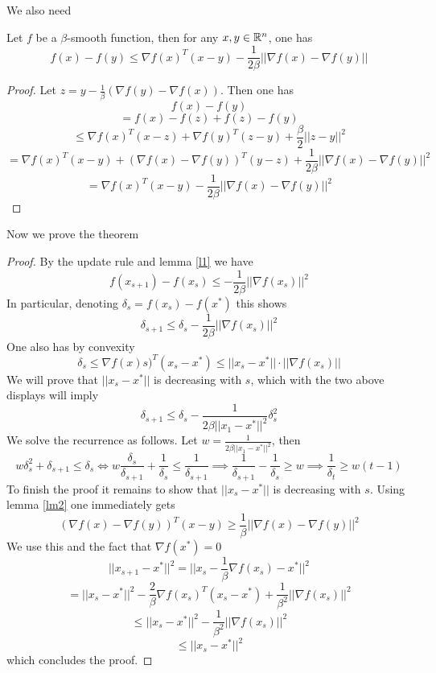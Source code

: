 We also need

\begin{lemma} \label{lm2}
Let $f$ be a $\beta$-smooth function, then for any $x,y \in \mathbb{R}^n$, one has
$$f(x) - f(y)\leq \nabla f(x)^T(x-y) - \frac{1}{2\beta}||\nabla f(x) - \nabla f(y)||$$
\end{lemma}

\begin{proof}
Let $z = y - \frac{1}{\beta}(\nabla f(y) - \nabla f(x))$.  Then one has
$$f(x) - f(y)$$
$$= f(x) - f(z) + f(z) - f(y)$$
$$\leq \nabla f(x)^T(x-z) + \nabla f(y)^T(z-y) + \frac{\beta}{2}||z-y||^2$$
$$= \nabla f(x)^T(x-y) + (\nabla f(x) - \nabla f(y))^T(y-z) + \frac{1}{2\beta}||\nabla f(x) - \nabla f(y)||^2$$
$$= \nabla f(x)^T(x-y) - \frac{1}{2\beta} ||\nabla f(x) - \nabla f(y)||^2$$
\end{proof}

Now we prove the theorem

\begin{proof}
By the update rule and lemma \ref{l1} we have
$$f(x_{s+1}) - f(x_s) \leq -\frac{1}{2\beta}||\nabla f(x_s)||^2 $$
In particular, denoting $\delta_s = f(x_s) - f(x^*)$ this shows
$$\delta_{s+1} \leq \delta_s - \frac{1}{2\beta}||\nabla f(x_s)||^2 $$
One also has by convexity
$$\delta_s \leq \nabla f(x)s)^T(x_s - x^*) \leq ||x_s - x^*|| \cdot ||\nabla f(x_s)||$$
We will prove that $||x_s - x^*||$ is decreasing with $s$, which with the two above displays will imply
$$\delta_{s+1}\leq \delta_s - \frac{1}{2\beta||x_1 - x^*||^2}\delta_s^2$$
We solve the recurrence as follows.  Let $w = \frac{1}{2\beta||x_1 - x^*||^2}$, then
$$w\delta_s^2 + \delta_{s+1} \leq \delta_s \iff w\frac{\delta_s}{\delta_{s+1}} + \frac
{1}{\delta_s} \leq \frac{1}{\delta_{s+1}} \implies \frac{1}{\delta_{s+1}} - \frac{1}{\delta_s} \geq w \implies \frac{1}{\delta_t} \geq w(t-1)$$
To finish the proof it remains to show that $||x_s - x^*||$ is decreasing with $s$.  Using lemma \ref{lm2} one immediately gets
$$ (\nabla f(x) - \nabla f(y))^T(x - y) \geq \frac{1}{\beta} ||\nabla f(x) - \nabla f(y)||^2$$
We use this and the fact that $\nabla f(x^*) = 0$
$$||x_{s+1} - x^*||^2 = ||x_s - \frac{1}{\beta}\nabla f(x_s) - x^*||^2$$
$$= ||x_s - x^*||^2 - \frac{2}{\beta}\nabla f(x_s)^T(x_s - x^*) + \frac{1}{\beta^2}||\nabla f(x_s)||^2 $$
$$\leq ||x_s - x^*||^2 - \frac{1}{\beta^2} ||\nabla f(x_s)||^2 $$
$$\leq ||x_s - x^*||^2$$
which concludes the proof.
\end{proof}

